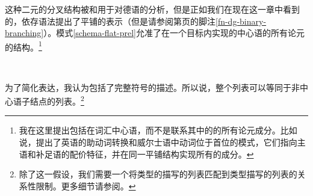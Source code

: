 这种二元的分叉结构被\citet{Kathol95a,Kathol2000a}和\citet{Mueller95c,Babel,Mueller99a,Mueller2002b}用于对德语的分析，但是正如我们在现在这一章中看到的，依存语法提出了平铺的表示（但是请参阅第\pageref{fn-dg-binary-branching}页的脚注\ref{fn-dg-binary-branching}）。模式\ref{schema-flat-prel}允准了在一个目标内实现的中心语的所有论元的结构。\footnote{我在这里提出包括在词汇中心语，而不是联系其中的\subcatlc 的所有论元成分。比如说，\citet[]{Borsley89}提出了英语的助动词转换和威尔士语中动词位于首位的模式，它们指向主语和补足语的配价特征，并在同一平铺结构实现所有的成分。}
\begin{schema}
\label{schema-flat-prel}
 \impl\\
\end{schema}
为了简化表达，我认为\subcatlc 包括了完整符号的描述。所以说，整个列表可以等同于非中心语子结点的列表。\footnote{
除了这一假设，我们需要一个将类型的描写的列表匹配到类型描写的列表的关系性限制。更多细节请参阅。
}

